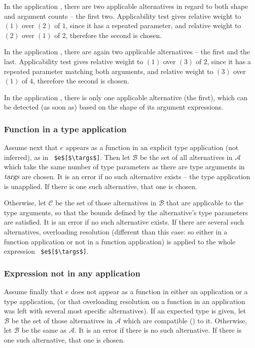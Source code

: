 In the application , there are two applicable alternatives in regard to both shape and argument counts -- the first two. Applicability test gives relative weight to $(1)$ over $(2)$ of $1$, since it has a repeated parameter, and relative weight to $(2)$ over $(1)$ of 2, therefore the second is chosen. 

In the application , there are again two applicable alternatives -- the first and the last. Applicability test gives relative weight to $(1)$ over $(3)$ of $2$, since it has a repeated parameter matching both arguments, and relative weight to $(3)$ over $(1)$ of $4$, therefore the second is chosen. 

In the application , there is only one applicable alternative (the first), which can be detected (as soon as) based on the shape of its argument expressions. 

\subsubsection{Function in a type application}

Assume next that $e$ appears as a function in an explicit type application (not inferred), as in ~\lstinline!$e$[$\targs$]!. Then let $\mathcal{B}$ be the set of all alternatives in $\mathcal{A}$ which take the same number of type parameters as there are type arguments in $\mbox{\sl targs}$ are chosen. It is an error if no such alternative exists -- the type application is unapplied. If there is one such alternative, that one is chosen. 

Otherwise, let $\mathcal{C}$ be the set of those alternatives in $\mathcal{B}$ that are applicable to the type arguments, so that the bounds defined by the alternative's type parameters are satisfied. It is an error if no such alternative exists. If there are several such alternatives, overloading resolution (different than this case: so either in a function application or not in a function application) is applied to the whole expression ~\lstinline!$e$[$\targs$]!. 

\subsubsection{Expression not in any application}
\label{sec:overloading-resolution-no-app}

Assume finally that $e$ does not appear as a function in either an application or a type application, (or that overloading resolution on a function in an application was left with several most specific alternatives). If an expected type is given, let $\mathcal{B}$ be the set of those alternatives in $\mathcal{A}$ which are compatible () to it. Otherwise, let $\mathcal{B}$ be the same as $\mathcal{A}$. It is an error if there is no such alternative. If there is one such alternative, that one is chosen. 

